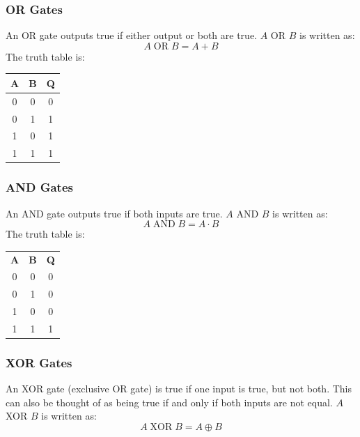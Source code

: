             \subsubsection{OR Gates}
                An OR gate outputs true if either output or both are true.
                $A$ OR $B$ is written as:
                \begin{equation}
                    A\;\text{OR}\;B=A+B
                \end{equation}
                The truth table is:
                \begin{center}
                    \begin{tabular}{c c|c}
                        \textbf{A} & \textbf{B} & \textbf{Q} \\
                        \hline
                        0 & 0 & 0 \\
                        0 & 1 & 1 \\
                        1 & 0 & 1 \\
                        1 & 1 & 1
                    \end{tabular}
                \end{center}
            \subsubsection{AND Gates}
                An AND gate outputs true if both inputs are true.
                $A$ AND $B$ is written as:
                \begin{equation}
                    A\;\text{AND}\;B=A\cdot B
                \end{equation}
                The truth table is:
                \begin{center}
                    \begin{tabular}{c c|c}
                        \textbf{A} & \textbf{B} & \textbf{Q} \\
                        0 & 0 & 0 \\
                        0 & 1 & 0 \\
                        1 & 0 & 0 \\
                        1 & 1 & 1
                    \end{tabular}
                \end{center}

            \subsubsection{XOR Gates}
                An XOR gate (exclusive OR gate) is true if one input is true, but not both.
                This can also be thought of as being true if and only if both inputs are not equal.
                $A$ XOR $B$ is written as:
                \begin{equation}
                    A\;\text{XOR}\;B=A\oplus B
                \end{equation}

